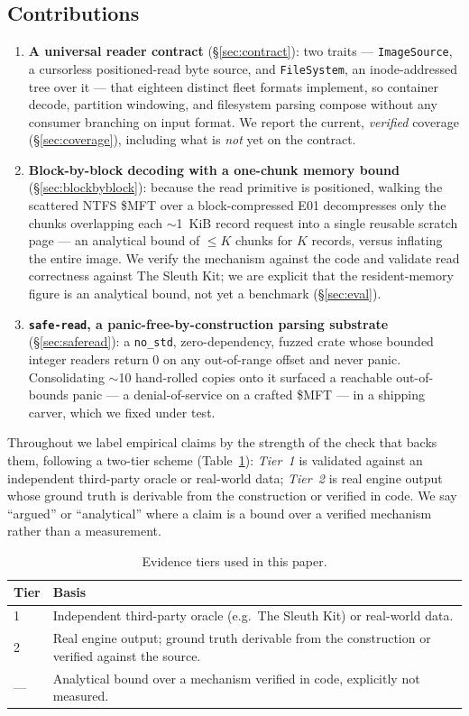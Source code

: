 \documentclass[10pt,twocolumn]{article}
\begin{document}
\subsection*{Contributions}
\begin{enumerate}
  \item \textbf{A universal reader contract} (\S\ref{sec:contract}): two traits
  --- \texttt{ImageSource}, a cursorless positioned-read byte source, and
  \texttt{FileSystem}, an inode-addressed tree over it --- that eighteen distinct
  fleet formats implement, so container decode, partition windowing, and
  filesystem parsing compose without any consumer branching on input format. We
  report the current, \emph{verified} coverage (\S\ref{sec:coverage}), including
  what is \emph{not} yet on the contract.
  \item \textbf{Block-by-block decoding with a one-chunk memory bound}
  (\S\ref{sec:blockbyblock}): because the read primitive is positioned, walking
  the scattered NTFS \$MFT over a block-compressed E01 decompresses only the
  chunks overlapping each $\sim$1~KiB record request into a single reusable
  scratch page --- an analytical bound of $\le K$ chunks for $K$ records, versus
  inflating the entire image. We verify the mechanism against the code and
  validate read correctness against The Sleuth Kit; we are explicit that the
  resident-memory figure is an analytical bound, not yet a benchmark
  (\S\ref{sec:eval}).
  \item \textbf{\texttt{safe-read}, a panic-free-by-construction parsing substrate}
  (\S\ref{sec:saferead}): a \texttt{no\_std}, zero-dependency, fuzzed crate whose
  bounded integer readers return $0$ on any out-of-range offset and never panic.
  Consolidating $\sim$10 hand-rolled copies onto it surfaced a reachable
  out-of-bounds panic --- a denial-of-service on a crafted \$MFT --- in a
  shipping carver, which we fixed under test.
\end{enumerate}

Throughout we label empirical claims by the strength of the check that backs
them, following a two-tier scheme (Table~\ref{tab:tiers}): \emph{Tier~1} is
validated against an independent third-party oracle or real-world data;
\emph{Tier~2} is real engine output whose ground truth is derivable from the
construction or verified in code. We say ``argued'' or ``analytical'' where a
claim is a bound over a verified mechanism rather than a measurement.

\begin{table}[t]\centering\small
\caption{Evidence tiers used in this paper.}\label{tab:tiers}
\begin{tabular}{@{}lp{5.4cm}@{}}
\toprule
Tier & Basis \\
\midrule
1 & Independent third-party oracle (e.g.\ The Sleuth Kit) or real-world data. \\
2 & Real engine output; ground truth derivable from the construction or verified against the source. \\
--- & Analytical bound over a mechanism verified in code, explicitly not measured. \\
\bottomrule
\end{tabular}
\end{table}
\end{document}
